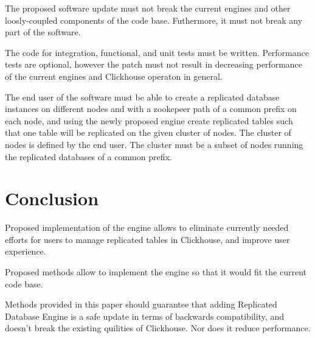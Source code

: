 \documentclass[conference]{IEEEtran}
\begin{document}
The proposed software update must not break the current engines and other loosly-coupled
components of the code base. Futhermore, it must not break any part of the software.

The code for integration, functional, and unit tests must be written.
Performance tests are optional, however the patch must not result in decreasing
performance of the current engines and Clickhouse operaton in general.

The end user of the software must be able to create a replicated
database instances on different nodes and with a zookepeer path of a common prefix
on each node, and using the newly proposed engine create replicated tables such that
one table will be replicated on the given cluster of nodes. The cluster of nodes
is defined by the end user. The cluster must be a subset of nodes running the replicated 
databases of a common prefix.

\section{Conclusion}
Proposed implementation of the engine allows to eliminate
currently needed efforts for users to manage replicated tables in Clickhouse,
and improve user experience.

Proposed methods allow to implement the engine so that it would fit the current
code base.

Methods provided in this paper should guarantee that adding Replicated Database
Engine is a safe update in terms of backwards compatibility, and doesn't break 
the existing quilities of Clickhouse. Nor does it reduce performance.
\end{document}
